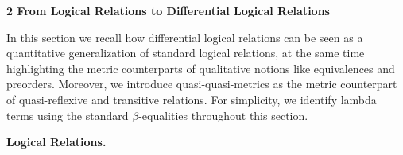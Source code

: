 
 
\par\medskip\noindent\textbf{2 From Logical Relations to Differential Logical Relations}\par
 
 
In this section we recall how differential logical relations can be seen as a quantitative generalization of standard logical relations, at the same time highlighting the metric counterparts of qualitative notions like equivalences and preorders. Moreover, we introduce quasi-quasi-metrics as the metric counterpart of quasi-reflexive and transitive relations. For simplicity, we identify lambda terms using the standard $\beta$-equalities throughout this section.\par
 
 
 
\par\medskip\noindent\textbf{Logical Relations.}\par
 
 
